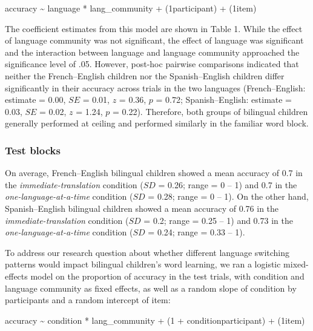 \documentclass[
  man,floatsintext]{apa7}
\begin{document}
accuracy \textasciitilde{} language * lang\_community + (1\textbar participant) + (1\textbar item)

\noindent The coefficient estimates from this model are shown in Table 1. While the effect of language community was not significant, the effect of language was significant and the interaction between language and language community approached the significance level of .05. However, post-hoc pairwise comparisons indicated that neither the French--English children nor the Spanish--English children differ significantly in their accuracy across trials in the two languages (French--English: estimate = 0.00, \(SE\) = 0.01, \(z\) = 0.36, \(p\) = 0.72; Spanish--English: estimate = 0.03, \(SE\) = 0.02, \(z\) = 1.24, \(p\) = 0.22). Therefore, both groups of bilingual children generally performed at ceiling and performed similarly in the familiar word block.

\hypertarget{test-blocks}{%
\subsubsection{Test blocks}\label{test-blocks}}

On average, French--English bilingual children showed a mean accuracy of 0.7 in the \emph{immediate-translation} condition (\(SD\) = 0.26; range = 0 -- 1) and 0.7 in the \emph{one-language-at-a-time} condition (\(SD\) = 0.28; range = 0 -- 1). On the other hand, Spanish--English bilingual children showed a mean accuracy of 0.76 in the \emph{immediate-translation} condition (\(SD\) = 0.2; range = 0.25 -- 1) and 0.73 in the \emph{one-language-at-a-time} condition (\(SD\) = 0.24; range = 0.33 -- 1).

To address our research question about whether different language switching patterns would impact bilingual children's word learning, we ran a logistic mixed-effects model on the proportion of accuracy in the test trials, with condition and language community as fixed effects, as well as a random slope of condition by participants and a random intercept of item:

accuracy \textasciitilde{} condition * lang\_community + (1 + condition\textbar participant) + (1\textbar item)
\end{document}
